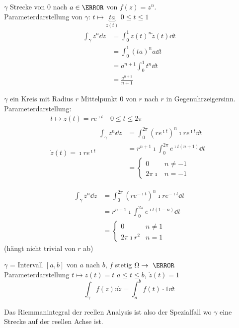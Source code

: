 \begin{bsp}
	$\gamma$ Strecke von $0$ nach $a \in \C$ von $f(z) = z^n$. \\
	Parameterdarstellung von $\gamma$: $t \mapsto \underbrace{ta}_{z(t)}$ $0 \leq t \leq 1$
	\[ \begin{split}
		\int_\gamma z^n \dd z	&= \int_0^1 z(t)^n \dot{z}(t) \dd t \\
							&= \int_0^1 (ta)^n a \dd t \\
							&= a^{n+1} \int_0^1 t^n \dd t \\
							&= \frac{a^{n+1}}{n+1}
	\end{split} \]
\end{bsp}
\begin{bsp}
	$\gamma$ ein Kreis mit Radius $r$ Mittelpunkt $0$ von $r$ nach $r$ in Gegenuhrzeigersinn. Parameterdarstellung:
	\begin{gather*}
		t \mapsto z(t) = re^{\imath t} \quad 0 \leq t \leq 2\pi \\
		\dot{z}(t) = \imath re^{\imath t}
		\begin{split}
			\int_\gamma z^n \dd z	&= \int_0^{2\pi} (re^{\imath t})^n \imath re^{\imath t} \dd t \\
								&= r^{n+1} \imath \int_0^{2\pi} e^{\imath t(n+1)} \dd t \\
								&= \begin{cases}
									0		&n \neq -1	\\
									2\pi\imath	&n = -1	
								\end{cases}
		\end{split}
	\end{gather*}
\end{bsp}
\begin{bsp}
	\[ \begin{split}
		\int_\gamma \overline{z}^n \dd z	&= \int_0^{2\pi} (re^{-\imath t})^n \imath re^{-\imath t} \dd t \\
								&= r^{n+1} \imath \int_0^{2\pi} e^{\imath t(1-n)} \dd t \\
								&= \begin{cases}
									0			& n \neq 1	\\
									2\pi\imath r^2	&n = 1	
								\end{cases}
	\end{split} \]
	(hängt nicht trivial von $r$ ab)
\end{bsp}
\begin{bsp}
		$\gamma$ = Intervall $[a,b]$ von $a$ nach $b$, $f$ stetig $\Omega \rightarrow \C$ \\
		Parameterdarstellung $t \mapsto z(t) = t$ $a \leq t \leq b$, $\dot{z}(t) = 1$
		\[ \int_\gamma f(z) \dd z = \int_a^b f(t) \cdot 1 \dd t \]
\end{bsp}
Das Riemmanintegral der reellen Analysis ist also der Spezialfall wo $\gamma$ eine Strecke auf der reellen Achse ist.

